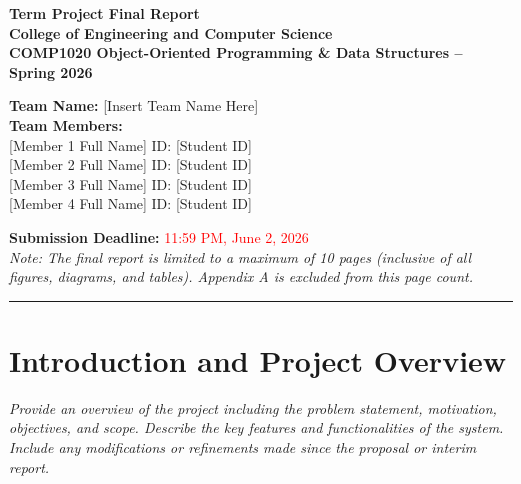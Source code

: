 \documentclass[12pt,oneside,openany,dvipsnames]{article}
\begin{document}
\thispagestyle{empty}


\begin{center}
{
    \color{blue}\sffamily\bfseries\Huge Term Project Final Report
}
\\
\vspace{0.5cm}
{
\sffamily\bfseries College of Engineering and Computer Science \\ 
COMP1020 Object-Oriented Programming \& Data Structures -- Spring 2026
}

\vspace{1cm}

{\large \textbf{Team Name:} [Insert Team Name Here]} \\
\vspace{0.3cm}
{\large \textbf{Team Members:}} \\
{[Member 1 Full Name]} \quad ID: {[Student ID]} \\
{[Member 2 Full Name]} \quad ID: {[Student ID]} \\
{[Member 3 Full Name]} \quad ID: {[Student ID]} \\
{[Member 4 Full Name]} \quad ID: {[Student ID]}

\vspace{1cm}

\textbf{Submission Deadline:} \textcolor{red}{11:59 PM, June 2, 2026} \\
\textit{Note: The final report is limited to a maximum of 10 pages (inclusive of all figures, diagrams, and tables). Appendix A is excluded from this page count.}

\end{center}

\vspace{0.5cm}
\hrule
\vspace{0.5cm}

\section{Introduction and Project Overview}

\textit{Provide an overview of the project including the problem statement, motivation, objectives, and scope. Describe the key features and functionalities of the system. Include any modifications or refinements made since the proposal or interim report.}
\end{document}
